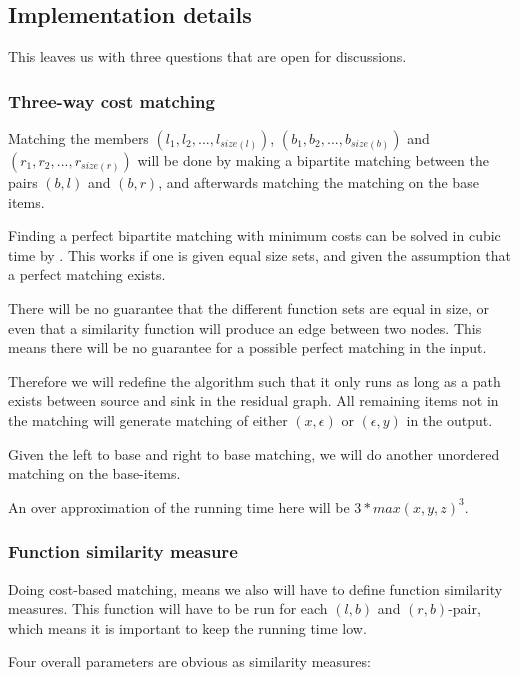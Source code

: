 \documentclass[11pt]{article}
\begin{document}
\subsection{Implementation details}
This leaves us with three questions that are open for discussions.

\subsubsection{Three-way cost matching}
Matching the members $(l_1, l_2, ..., l_{size(l)})$, $(b_1, b_2, ..., b_{size(b)})$ and $(r_1, r_2, ..., r_{size(r)})$ will be done by making a bipartite matching between the pairs $(b, l)$ and $(b, r)$, and afterwards matching the matching on the base items.

Finding a perfect bipartite matching with minimum costs can be solved in cubic time by \citet{bipartitecost}. This works if one is given equal size sets, and given the assumption that a perfect matching exists.

There will be no guarantee that the different function sets are equal in size, or even that a similarity function will produce an edge between two nodes. This means there will be no guarantee for a possible perfect matching in the input. 

Therefore we will redefine the algorithm such that it only runs as long as a path exists between source and sink in the residual graph. All remaining items not in the matching will generate matching of either $(x, \epsilon)$ or $(\epsilon, y)$ in the output.

Given the left to base and right to base matching, we will do another unordered matching on the base-items.


An over approximation of the running time here will be  $3*max(x, y, z)^3$.

\subsubsection{Function similarity measure}
Doing cost-based matching, means we also will have to define function similarity measures. This function will have to be run for each $(l, b)$ and $(r, b)$-pair, which means it is important to keep the running time low.

Four overall parameters are obvious as similarity measures:
\end{document}
